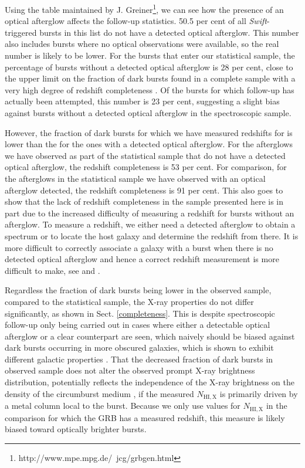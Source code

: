\documentclass{aa}    %
\begin{document}
Using the table maintained by
J. Greiner\footnote{http://www.mpe.mpg.de/~jcg/grbgen.html}, we can see how the
presence of an optical afterglow affects the follow-up statistics. 50.5 per cent
of all \textit{Swift}-triggered bursts in this list do not have a detected
optical afterglow. This number also includes bursts where no optical
observations were available, so the real number is likely to be lower. For the
bursts that enter our statistical sample, the percentage of bursts without a
detected optical afterglow is 28 per cent, close to the upper limit on the
fraction of dark bursts found in a complete sample with a very high degree of
redshift completeness \citep{Melandri2012}. Of the bursts for which follow-up
has actually been attempted, this number is 23 per cent, suggesting a slight
bias against bursts without a detected optical afterglow in the spectroscopic
sample.

However, the fraction of dark bursts for which we have measured redshifts for is
lower than the for the ones with a detected optical afterglow. For the
afterglows we have observed as part of the statistical sample that do not have a
detected optical afterglow, the redshift completeness is 53 per cent. For
comparison, for the afterglows in the statistical sample we have observed with
an optical afterglow detected, the redshift completeness is 91 per cent. This
also goes to show that the lack of redshift completeness in the sample presented
here is in part due to the increased difficulty of measuring a redshift for
bursts without an afterglow. To measure a redshift, we either need a detected
afterglow to obtain a spectrum or to locate the host galaxy and determine the
redshift from there. It is more difficult to correctly associate a galaxy with a
burst when there is no detected optical afterglow and hence a correct redshift
measurement is more difficult to make, see \citet{Jakobsson2005, Levesque2010}
and \citet{Perley2017}.

Regardless the fraction of dark bursts being lower in the observed sample,
compared to the statistical sample, the X-ray properties do not differ
significantly, as shown in Sect. \ref{completeness}. This is despite
spectroscopic follow-up only being carried out in cases where either a
detectable optical afterglow or a clear counterpart are seen, which naively
should be biased against dark bursts occurring in more obscured galaxies, which
is shown to exhibit different galactic properties \citep{Perley2009,
	Kruhler2011, Rossi2012, Perley2013b, Perley2015b}. That the decreased fraction
of dark bursts in observed sample does not alter the observed prompt X-ray
brightness distribution, potentially reflects the independence of the X-ray
brightness on the density of the circumburst medium \citep{Freedman2001,
	Berger2003, Nysewander2009}, if the measured $N_{\mathrm{HI, X}}$ is primarily
driven by a metal column local to the burst. Because we only use values for
$N_{\mathrm{HI, X}}$ in the comparison for which the GRB has a measured
redshift, this measure is likely biased toward optically brighter bursts.
\end{document}
